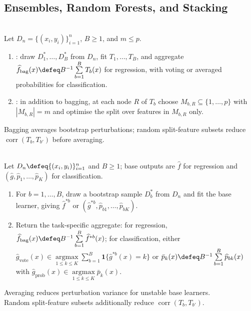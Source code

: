\subsection{Ensembles, Random Forests, and Stacking}
\begin{definition} \label{def:sl-bagging-random-forest} \\
Let $D_n=\{(x_i,y_i)\}_{i=1}^n$, $B\geq1$, and $m\leq p$.
\begin{enumerate}[label=(\roman*)]
\setlength{\itemsep}{0pt}
\item {}: draw $D_1^*,\ldots,D_B^*$ from $D_n$, fit $T_1,\ldots,T_B$, and aggregate $\widehat{f}_{\mathrm{bag}}(x)\defeq B^{-1}\sum\limits_{b=1}^B T_b(x)$ for regression, with voting or averaged probabilities for classification.
\item {}: in addition to bagging, at each node $R$ of $T_b$ choose $M_{b,R}\subseteq\{1,\ldots,p\}$ with $|M_{b,R}|=m$ and optimise the split over features in $M_{b,R}$ only.
\end{enumerate}
Bagging averages bootstrap perturbations; random split-feature subsets reduce $\operatorname{corr}(T_b,T_{b'})$ before averaging.
\end{definition}

\begin{method} \label{meth:sl-bagging-prediction-aggregation} \\
Let $D_n\defeq\{(x_i,y_i)\}_{i=1}^n$ and $B\geq1$; base outputs are $\widehat{f}$ for regression and $(\widehat{g},\widehat{p}_1,\ldots,\widehat{p}_K)$ for classification.
\begin{enumerate}[label=(\roman*)]
\setlength{\itemsep}{0pt}
\item For $b=1,\ldots,B$, draw a bootstrap sample $D_b^*$ from $D_n$ and fit the base learner, giving $\widehat{f}^{*b}$ or $(\widehat{g}^{*b},\widehat{p}_{b1},\ldots,\widehat{p}_{bK})$.
\item Return the task-specific aggregate: for regression, $\widehat{f}_{\mathrm{bag}}(x)\defeq B^{-1}\sum\limits_{b=1}^B\widehat{f}^{*b}(x)$; for classification, either $\widehat{g}_{\mathrm{vote}}(x)\in\operatorname*{argmax}\limits_{1\leq k\leq K}\sum\limits_{b=1}^B\mathbf{1}\{\widehat{g}^{*b}(x)=k\}$ or $\bar{p}_k(x)\defeq B^{-1}\sum\limits_{b=1}^B\widehat{p}_{bk}(x)$ with $\widehat{g}_{\mathrm{prob}}(x)\in\operatorname*{argmax}\limits_{1\leq k\leq K}\bar{p}_k(x)$.
\end{enumerate}
Averaging reduces perturbation variance for unstable base learners.\\
Random split-feature subsets additionally reduce $\operatorname{corr}(T_b,T_{b'})$.
\end{method}

